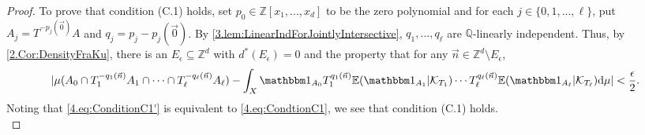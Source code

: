 \documentclass[11pt,american,preprint]{elsarticle}
\numberwithin{equation}{section}
\theoremstyle{plain}
\theoremstyle{plain*}
\theoremstyle{plain}
\theoremstyle{plain*}
\theoremstyle{plain}
\theoremstyle{plain*}
\theoremstyle{remark}
\theoremstyle{remark*}
\theoremstyle{remark}
\theoremstyle{remark*}
\theoremstyle{remark}
\theoremstyle{remark*}
\theoremstyle{plain}
\theoremstyle{definition}
\theoremstyle{plain}
\theoremstyle{plain} %
\newcommand{\Q}{\mathbb{Q}}
\newcommand{\Z}{\mathbb{Z}}
\begin{document}
\begin{proof}
To prove that condition (C.1) holds,
set $p_0\in \Z[x_1,...,x_d]$ to be the zero polynomial and for each $j\in\{0,1,...,\ell\}$, put $A_j=T^{-p_j(\vec 0)}A$ and $q_j=p_j-p_j(\vec 0)$. By \cref{3.lem:LinearIndForJointlyIntersective}, $q_1,...,q_\ell$ are $\Q$-linearly independent. Thus, by \cref{2.Cor:DensityFraKu}, there is an  $E_\epsilon\subseteq \Z^d$ with $d^*(E_\epsilon)=0$ and the property that 
for any $\vec n\in \Z^d\setminus E_\epsilon$,
\begin{equation}\label{4.eq:ConditionC1'}
|\mu(A_0\cap T_1^{-q_1(\vec n)}A_1\cap \cdots\cap T_\ell^{-q_\ell(\vec n)}A_\ell)-\int_X \mathbbm 1_{A_0} T_1^{q_1(\vec n)}\mathbb E(\mathbbm 1_{A_1}|\mathcal K_{T_1})\cdots T_\ell^{q_
\ell(\vec n)}\mathbb E(\mathbbm 1_{A_\ell}|\mathcal K_{T_\ell})\text{d}\mu|<\frac{\epsilon}{2}.
\end{equation}
Noting that \eqref{4.eq:ConditionC1'} is equivalent to \eqref{4.eq:CondtionC1}, we see that condition (C.1) holds.\\


\end{proof}
\end{document}
